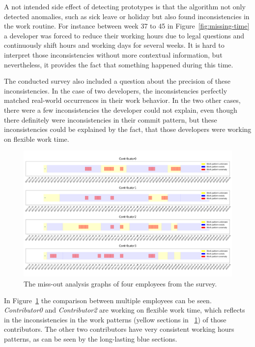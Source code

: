 A not intended side effect of detecting prototypes is that the algorithm not only detected anomalies, such as sick leave or holiday but also found inconsistencies in the work routine.
For instance between week 37 to 45 in Figure~\ref{fig:missing-time} a developer was forced to reduce their working hours due to legal questions and continuously shift hours and working days for several weeks.
It is hard to interpret those inconsistencies without more contextual information, but nevertheless, it provides the fact that something happened during this time.

The conducted survey also included a question about the precision of these inconsistencies.
In the case of two developers, the inconsistencies perfectly matched real-world occurrences in their work behavior.
In the two other cases, there were a few inconsistencies the developer could not explain, even though there definitely were inconsistencies in their commit pattern, but these inconsistencies could be explained by the fact, that those developers were working on flexible work time.

\begin{figure}[H]
    \includegraphics[scale=0.20]{./graphs/analysis/work-time-analysis-comparison}
    \centering
    \caption{The miss-out analysis graphs of four employees from the survey.}\label{fig:miss-out-comparison}
\end{figure}

In Figure~\ref{fig:miss-out-comparison} the comparison between multiple employees can be seen.
\emph{Contributor0} and \emph{Contributor2} are working on flexible work time, which reflects in the inconsistencies in the work patterns (yellow sections in ~\ref{fig:miss-out-comparison}) of those contributors.
The other two contributors have very consistent working hours patterns, as can be seen by the long-lasting blue sections.
